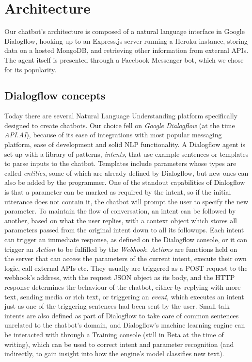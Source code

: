 \section*{Architecture}
Our chatbot's architecture is composed of a natural language interface in Google Dialogflow, hooking up to an Express.js server running a Heroku instance, storing data on a hosted MongoDB, and retrieving other information from external APIs. The agent itself is presented through a Facebook Messenger bot, which we chose for its popularity.
\subsection*{Dialogflow concepts}
Today there are several Natural Language Understanding platform specifically designed to create chatbots. Our choice fell on \textit{Google Dialogflow} (at the time \textit{API.AI}), because of its ease of integrations with most popular messaging platform, ease of development and solid NLP functionality. A Dialogflow agent is set up with a library of patterns, \textit{intents}, that use example sentences or templates to parse inputs to the chatbot. Templates include parameters whose types are called \textit{entities}, some of which are already defined by Dialogflow, but new ones can also be added by the programmer. One of the standout capabilities of Dialogflow is that a parameter can be marked as required by the intent, so if the initial utterance does not contain it, the chatbot will prompt the user to specify the new parameter. To maintain the flow of conversation, an intent can be followed by another, based on what the user replies, with a context object which stores all parameters passed from the original intent down to all its followups. Each intent can trigger an immediate response, as defined on the Dialogflow console, or it can trigger an \textit{Action} to be fulfilled by the \textit{Webhook}. \textit{Actions} are functions held on the server that can access the parameters of the current intent, execute their own logic, call external APIs etc. They usually are triggered as a POST request to the webhook's address, with the request JSON object as its body, and the HTTP response determines the behaviour of the chatbot, either by replying with more text, sending media or rich text, or triggering an \textit{event}, which executes an intent just as one of the triggering sentences had been sent by the user. Small talk intents are also defined as part of Dialogflow to take care of common sentences unrelated to the chatbot's domain, and Dialogflow's machine learning engine can be interacted with through a Training console (still in Beta at the time of writing), which can be used to correct intent and parameter recognition (and indirectly, to gain insight into how the engine's model classifies new text).


